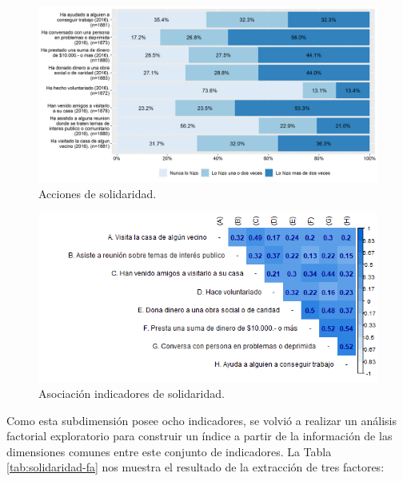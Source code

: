 \documentclass[
  12pt,
]{book}
\begin{document}
\begin{figure}[H]

{\centering \includegraphics[width=1\linewidth,height=1\textheight]{output/graphs/solidaridad} 

}

\caption{Acciones de solidaridad.}\label{fig:solidaridad}
\end{figure}

\begin{figure}[H]

{\centering \includegraphics[width=1\linewidth,height=1\textheight]{output/graphs/solidaridad_cor} 

}

\caption{Asociación indicadores de solidaridad.}\label{fig:solidaridad-cor}
\end{figure}

Como esta subdimensión posee ocho indicadores, se volvió a realizar un análisis factorial exploratorio para construir un índice a partir de la información de las dimensiones comunes entre este conjunto de indicadores. La Tabla \ref{tab:solidaridad-fa} nos muestra el resultado de la extracción de tres factores:
\end{document}
